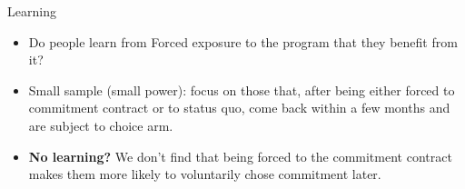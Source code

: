 \documentclass[8pt]{beamer}
\begin{document}
\begin{frame}{Learning}
    \label{learning_table}
    \begin{itemize}
    \item  Do people learn from Forced exposure to the program that they benefit from it?  
    \vspace{.1in}
    \item  Small sample (small power): focus on those that, after being either forced to commitment contract or to status quo, come back within a few months and are subject to choice arm.
    \vspace{.1in}
    \item  \textbf{No learning?} We don't find that being forced to the commitment contract makes them more likely to voluntarily chose commitment later.
 \end{itemize}  
 \vspace{.2in}
\begin{table}[H]
\begin{center}
\small{}
\end{center}
\end{table}
\end{frame}
\end{document}
